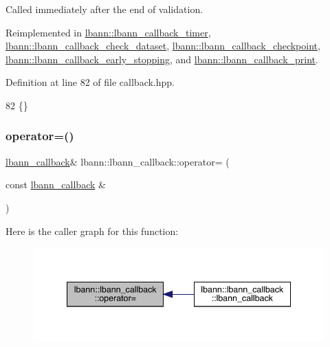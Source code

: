 Called immediately after the end of validation. 

Reimplemented in \hyperlink{classlbann_1_1lbann__callback__timer_a0fea502078111627d340340a63768f9f}{lbann\+::lbann\+\_\+callback\+\_\+timer}, \hyperlink{classlbann_1_1lbann__callback__check__dataset_a9bcb1368152c621c4484136ec8eecff8}{lbann\+::lbann\+\_\+callback\+\_\+check\+\_\+dataset}, \hyperlink{classlbann_1_1lbann__callback__checkpoint_a5fb4288c03b1ce14681b72562e9471b2}{lbann\+::lbann\+\_\+callback\+\_\+checkpoint}, \hyperlink{classlbann_1_1lbann__callback__early__stopping_a32eb9c5e763c97ab1162cfebea7ad049}{lbann\+::lbann\+\_\+callback\+\_\+early\+\_\+stopping}, and \hyperlink{classlbann_1_1lbann__callback__print_a7090572e2f89e7994872b5fdb612dd3f}{lbann\+::lbann\+\_\+callback\+\_\+print}.



Definition at line 82 of file callback.\+hpp.


\begin{DoxyCode}
82 \{\}
\end{DoxyCode}
\mbox{\label{classlbann_1_1lbann__callback_a66b0a8c00a273669fa782ece59e8898b}} 
\subsubsection{\texorpdfstring{operator=()}{operator=()}}
{\footnotesize\ttfamily \hyperlink{classlbann_1_1lbann__callback}{lbann\+\_\+callback}\& lbann\+::lbann\+\_\+callback\+::operator= (\begin{DoxyParamCaption}\item[{const \hyperlink{classlbann_1_1lbann__callback}{lbann\+\_\+callback} \&}]{ }\end{DoxyParamCaption})\hspace{0.3cm}{\ttfamily [default]}}

Here is the caller graph for this function\+:\nopagebreak
\begin{figure}[H]
\begin{center}
\leavevmode
\includegraphics[width=340pt]{classlbann_1_1lbann__callback_a66b0a8c00a273669fa782ece59e8898b_icgraph}
\end{center}
\end{figure}
\mbox{\label{classlbann_1_1lbann__callback_a02d924df2f8ca851578dc76d9015e48d}} 
